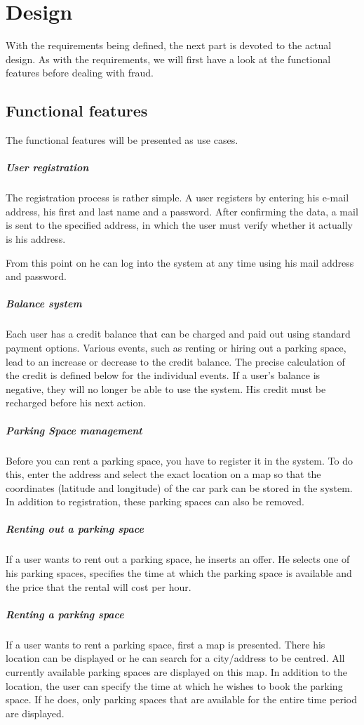 \documentclass[
a4paper,     %
titlepage,   %
14pt         %
]{scrartcl}  %
\theoremstyle{mystyle}
\begin{document}
\section{Design}
With the requirements being defined, the next part is devoted to the actual design. As with the requirements, we will first have a look at the functional features before dealing with fraud.

\subsection{Functional features}
The functional features will be presented as use cases.
\subparagraph{User registration} The registration process is rather simple. A user registers by entering his e-mail address, his first and last name and a password. After confirming the data, a mail is sent to the specified address, in which the user must verify whether it actually is his address.

From this point on he can log into the system at any time using his mail address and password.

\subparagraph{Balance system} Each user has a credit balance that can be charged and paid out using standard payment options. Various events, such as renting or hiring out a parking space, lead to an increase or decrease to the credit balance. The precise calculation of the credit is defined below for the individual events. If a user's balance is negative, they will no longer be able to use the system. His credit must be recharged before his next action.

\subparagraph{Parking Space management} Before you can rent a parking space, you have to register it in the system. To do this, enter the address and select the exact location on a map so that the coordinates (latitude and longitude) of the car park can be stored in the system. In addition to registration, these parking spaces can also be removed.

\subparagraph{Renting out a parking space} If a user wants to rent out a parking space, he inserts an offer. He selects one of his parking spaces, specifies the time at which the parking space is available and the price that the rental will cost per hour.

\subparagraph{Renting a parking space} If a user wants to rent a parking space, first a map is presented. There his location can be displayed or he can search for a city/address to be centred. All currently available parking spaces are displayed on this map. In addition to the location, the user can specify the time at which he wishes to book the parking space. If he does, only parking spaces that are available for the entire time period are displayed.
\end{document}
